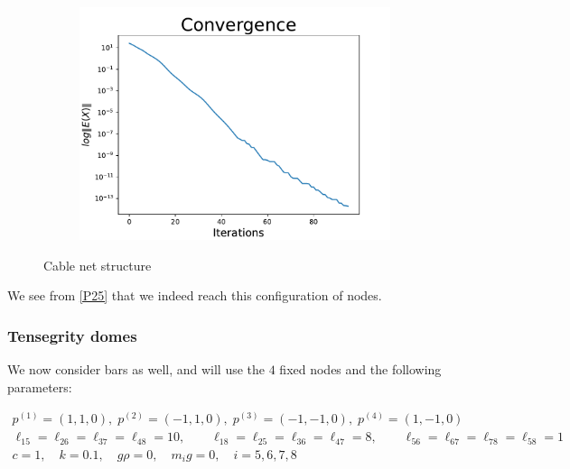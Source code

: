 \begin{figure}[!ht]
\begin{subfigure}{.72\textwidth}
\end{subfigure}%
\begin{subfigure}{.3\textwidth}
  \centering
  \includegraphics[width=0.99\linewidth]{Bilder/P25conv.pdf}
  \label{fig:sub2}
\end{subfigure}
\caption{Cable net structure}
\label{P25}
\end{figure}

We see from \eqref{P25} that we indeed reach this configuration of nodes. 

\subsubsection{Tensegrity domes}
We now consider bars as well, and will use the $4$ fixed nodes and the following parameters:

\begin{equation*}
    \begin{gathered}
    p^{(1)} = (1,1,0),\; p^{(2)} = (-1,1,0),\; p^{(3)} = (-1,-1,0),\; p^{(4)} = (1,-1,0)\\
    \ell_{15} = \ell_{26} = \ell_{37} = \ell_{48} = 10, \qquad \ell_{18} = \ell_{25} = \ell_{36} = \ell_{47} = 8, \qquad \ell_{56} = \ell_{67} = \ell_{78} = \ell_{58} = 1\\
    c=1, \quad k= 0.1, \quad g \rho = 0,\quad m_i g = 0, \quad i = 5,6,7,8
    \end{gathered}
\end{equation*}


